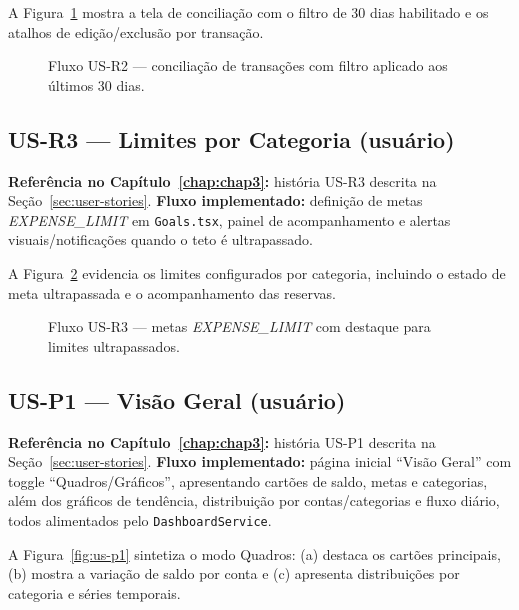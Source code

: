 A Figura~\ref{fig:us-r2} mostra a tela de conciliação com o filtro de 30 dias habilitado e os atalhos de edição/exclusão por transação.

\begin{figure}[!htbp]
\centering
{}
\caption{Fluxo US-R2 — conciliação de transações com filtro aplicado aos últimos 30 dias.}
\label{fig:us-r2}
\end{figure}

\FloatBarrier

\subsection{US-R3 — Limites por Categoria (usuário)}
\textbf{Referência no Capítulo~\ref{chap:chap3}:} história US-R3 descrita na Seção~\ref{sec:user-stories}.
\textbf{Fluxo implementado:} definição de metas \textit{EXPENSE\_LIMIT} em \texttt{Goals.tsx}, painel de acompanhamento e alertas visuais/notificações quando o teto é ultrapassado.

A Figura~\ref{fig:us-r3} evidencia os limites configurados por categoria, incluindo o estado de meta ultrapassada e o acompanhamento das reservas.

\begin{figure}[!htbp]
\centering
{}
\caption{Fluxo US-R3 — metas \textit{EXPENSE\_LIMIT} com destaque para limites ultrapassados.}
\label{fig:us-r3}
\end{figure}

\FloatBarrier

\subsection{US-P1 — Visão Geral (usuário)}
\textbf{Referência no Capítulo~\ref{chap:chap3}:} história US-P1 descrita na Seção~\ref{sec:user-stories}.
\textbf{Fluxo implementado:} página inicial ``Visão Geral'' com toggle ``Quadros/Gráficos'', apresentando cartões de saldo, metas e categorias, além dos gráficos de tendência, distribuição por contas/categorias e fluxo diário, todos alimentados pelo \texttt{DashboardService}.

A Figura~\ref{fig:us-p1} sintetiza o modo Quadros: (a) destaca os cartões principais, (b) mostra a variação de saldo por conta e (c) apresenta distribuições por categoria e séries temporais.

